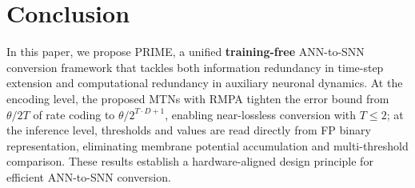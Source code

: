 \section{Conclusion}

In this paper, we propose PRIME, a unified \textbf{training-free} ANN-to-SNN conversion framework that tackles both information redundancy in time-step extension and computational redundancy in auxiliary neuronal dynamics.
At the encoding level, the proposed MTNs with RMPA tighten the error bound from $\theta/2T$ of rate coding to $\theta/2^{T \cdot D+1}$, enabling near-lossless conversion with $T \leq 2$; 
at the inference level, thresholds and values are read directly from FP binary representation, eliminating membrane potential accumulation and multi-threshold comparison.
These results establish a hardware-aligned design principle for efficient ANN-to-SNN conversion.



